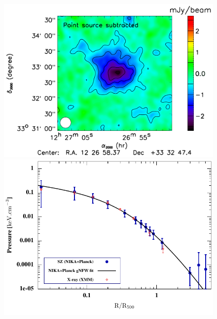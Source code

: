 \documentclass[11pt,a4paper,twoside,graphicx,color]{article}
\begin{document}

\newpage




\begin{figure}[t]
  \centering
\hspace*{-1cm}   \includegraphics[scale=0.45]{./Figures/CL1226}
   \includegraphics[scale=0.7]{./Figures/Pressurenonparam.pdf}

\end{figure}
\end{document}
